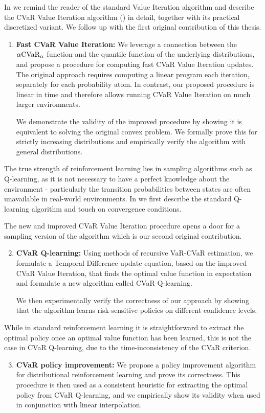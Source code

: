 In  we remind the reader of the standard Value Iteration algorithm and describe the CVaR Value Iteration algorithm (\citet{chow2015risk}) in detail, together with its practical discretized variant. We follow up with the first original contribution of this thesis.
\begin{enumerate}
\item \textbf{Fast CVaR Value Iteration:} We leverage a connection between the $\alpha\text{CVaR}_\alpha$ function and the quantile function of the underlying distributions, and propose a procedure for computing fast CVaR Value Iteration updates. The original approach requires computing a linear program each iteration, separately for each probability atom. In contrast, our proposed procedure is linear in time and therefore allows running CVaR Value Iteration on much larger environments.

We demonstrate the validity of the improved procedure by showing it is equivalent to solving the original convex problem. We formally prove this for strictly increasing distributions and empirically verify the algorithm with general distributions.
\end{enumerate}

The true strength of reinforcement learning lies in sampling algorithms such as Q-learning, as it is not necessary to have a perfect knowledge about the environment - particularly the transition probabilities between states are often unavailable in real-world environments. In  we first describe the standard Q-learning algorithm and touch on convergence conditions. 

The new and improved CVaR Value Iteration procedure opens a door for a sampling version of the algorithm which is our second original contribution.
\begin{enumerate}
\setcounter{enumi}{1}
\item \textbf{CVaR Q-learning:} Using methods of recursive VaR-CVaR estimation, we formulate a Temporal Difference update equation, based on the improved CVaR Value Iteration, that finds the optimal value function in expectation and formulate a new algorithm called CVaR Q-learning.

We then experimentally verify the correctness of our approach by showing that the algorithm learns risk-sensitive policies on different confidence levels.
\end{enumerate}

While in standard reinforcement learning it is straightforward to extract the optimal policy once an optimal value function has been learned, this is not the case in CVaR Q-learning, due to the time-inconsistency of the CVaR criterion.
\begin{enumerate}
\setcounter{enumi}{2}
\item \textbf{CVaR policy improvement:} We propose a policy improvement algorithm for distributional reinforcement learning and prove its correctness. This procedure is then used as a consistent heuristic for extracting the optimal policy from CVaR Q-learning, and we empirically show its validity when used in conjunction with linear interpolation.
\end{enumerate}

